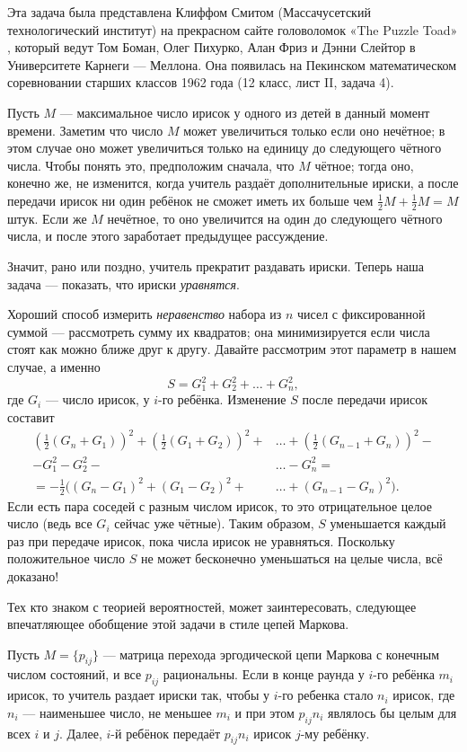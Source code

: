 Эта задача была представлена Клиффом Смитом (Массачусетский технологический институт) на прекрасном сайте головоломок «The Puzzle Toad» \cite{bohman-pikhurko-frieze-sleator}, который ведут Том Боман, Олег Пихурко, Алан Фриз и Дэнни Слейтор в Университете Карнеги — Меллона.
Она появилась на Пекинском математическом соревновании старших классов 1962 года (12 класс, лист II, задача 4).

Пусть $M$ --- максимальное число ирисок у одного из детей в данный момент времени.
Заметим что число $M$ может увеличиться только если оно нечётное;
в этом случае оно может увеличиться только на единицу до следующего чётного числа.
Чтобы понять это, предположим сначала, что $M$ чётное; тогда оно, конечно же, не изменится, когда учитель раздаёт дополнительные ириски, а после передачи ирисок ни один ребёнок не сможет иметь их больше чем $\tfrac12 M + \tfrac12 M = M$ штук.
Если же $M$ нечётное, то оно увеличится на один до следующего чётного числа, и после этого заработает предыдущее рассуждение.

Значит, рано или поздно, учитель прекратит раздавать ириски.
Теперь наша задача --- показать, что ириски \emph{уравнятся}.

Хороший способ измерить \emph{неравенство} набора из $n$ чисел с фиксированной суммой --- рассмотреть сумму их квадратов; она минимизируется если числа стоят как можно ближе друг к другу.
Давайте рассмотрим этот параметр в нашем случае, а именно 
\[S = G^2_1 + G^2_2 + \dots + G^2_n,\]
где $G_i$ --- число ирисок, у $i$-го ребёнка.
Изменение $S$ после передачи ирисок составит
\begin{align*}
\left(\tfrac{1}{2}(G_n+G_1)\right)^2+\left(\tfrac{1}{2}(G_1+G_2)\right)^2+&\dots+\left(\tfrac{1}{2}(G_{n-1}+G_n)\right)^2-
\\
-G_1^2-G_2^2-&\dots-G_n^2=
\\
=-\tfrac12\bigl((G_n-G_1)^2+(G_1-G_2)^2+&\dots+(G_{n-1}-G_n)^2\bigr).
\end{align*}
Если есть пара соседей с разным числом ирисок, то это отрицательное целое число (ведь все $G_i$ сейчас уже чётные).
Таким образом, $S$ уменьшается каждый раз при передаче ирисок, пока числа ирисок не уравняться.
Поскольку положительное число $S$ не может бесконечно уменьшаться на целые числа, всё доказано!

\medskip

Тех кто знаком с теорией вероятностей, может заинтересовать, следующее впечатляющее обобщение этой задачи в стиле цепей Маркова.

Пусть $M=\{p_{ij}\}$ --- матрица перехода эргодической цепи Маркова с конечным числом состояний, и все $p_{ij}$ рациональны.
Если в конце раунда у $i$-го ребёнка $m_i$ ирисок,
то учитель раздает ириски так, чтобы у $i$-го ребенка стало $n_i$ ирисок, где $n_i$ --- наименьшее число, не меньшее  $m_i$ и при этом $p_{ij}n_i$ являлось бы целым для всех $i$ и $j$.
Далее, $i$-й ребёнок передаёт $p_{ij}n_i$ ирисок $j$-му ребёнку.

